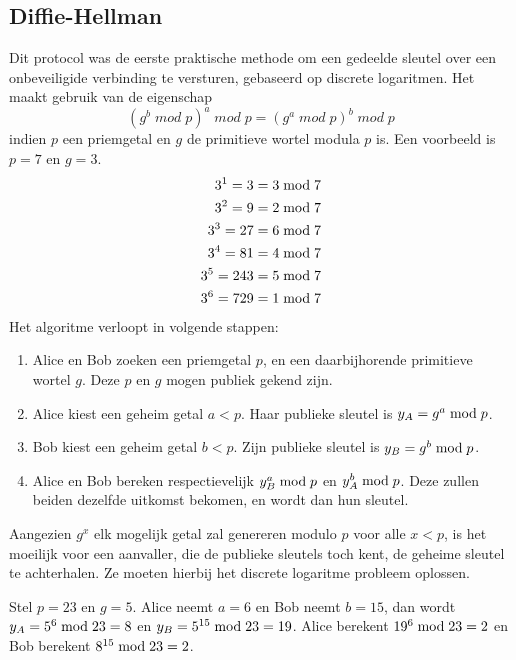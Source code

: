 \documentclass{report}
\begin{document}
	\subsection{Diffie-Hellman}
	Dit protocol was de eerste praktische methode om een gedeelde sleutel over een onbeveiligide verbinding te versturen, gebaseerd op discrete logaritmen. Het maakt gebruik van de eigenschap
	$$(g^b\;mod\;p)^a\;mod\;p = (g^a\;mod\;p)^b\;mod\;p$$ indien $p$ een priemgetal en $g$ de primitieve wortel modula $p$ is. Een voorbeeld is $p = 7$ en $g = 3$. 
	\begin{equation*}
		\begin{split}
			3^1 = 3 & = 3\;\hbox{mod}\;7\\
			3^2 = 9 & = 2\;\hbox{mod}\;7\\
			3^3 = 27 & = 6\;\hbox{mod}\;7\\
			3^4 = 81 &  = 4\;\hbox{mod}\;7\\
			3^5 = 243  & = 5\;\hbox{mod}\;7\\
			3^6 = 729  & = 1\;\hbox{mod}\;7\\
		\end{split}
	\end{equation*}
	Het algoritme verloopt in volgende stappen:
	\begin{enumerate}
		\item Alice en Bob zoeken een priemgetal $p$, en een daarbijhorende primitieve wortel $g$. Deze $p$ en $g$ mogen publiek gekend zijn.
		\item Alice kiest een geheim getal $a < p$. Haar publieke sleutel is $y_A = g^a\;\hbox{mod}\;p$.
		\item Bob kiest een geheim getal $b < p$. Zijn publieke sleutel is $y_B = g^b\;\hbox{mod}\;p$.
		\item Alice en Bob bereken respectievelijk $y_B^a\;\hbox{mod}\;p$ en $y_A^b\;\hbox{mod}\;p$. Deze zullen beiden dezelfde uitkomst bekomen, en wordt dan hun sleutel. 
	\end{enumerate}
	 Aangezien $g^x$ elk mogelijk getal zal genereren modulo $p$ voor alle $x < p$, is het moeilijk voor een aanvaller, die de publieke sleutels toch kent, de geheime sleutel te achterhalen. Ze moeten hierbij het discrete logaritme probleem oplossen. 
	 
	 Stel $p = 23$ en $g = 5$. Alice neemt $a = 6$ en Bob neemt $b = 15$, dan wordt $y_A = 5^6\;\hbox{mod}\;23 = 8$ en $y_B = 5^{15}\;\hbox{mod}\;23 = 19$. Alice berekent $19^6\;\hbox{mod}\;23 = 2$ en Bob berekent  $8^{15}\;\hbox{mod}\;23 = 2$.
\end{document}
